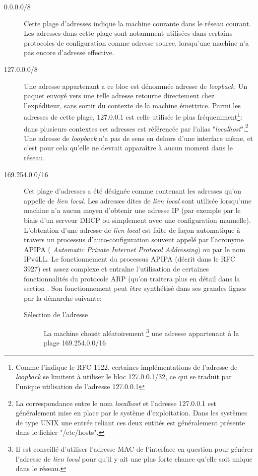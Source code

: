 \begin{description}
\item[0.0.0.0/8]
Cette plage d'adresses indique la machine courante dans le réseau courant.
Les adresses dans cette plage sont notamment utilisées dans certains protocoles de
configuration comme adresse source, lorsqu'une machine n'a pas encore d'adresse effective.

\item[127.0.0.0/8]
Une adresse appartenant a ce bloc est dénommée adresse de {\it loopback}.  Un
paquet envoyé vers une telle adresse retourne directement chez l'expéditeur, sans sortir
du contexte de la machine émettrice. Parmi les adresses de cette plage,
127.0.0.1 est celle utilisée le plus fréquemment\footnote{Comme l'indique
le RFC 1122, certaines implémentations de l'adresse de {\it loopback} se
limitent à utiliser le bloc 127.0.0.1/32, ce qui se traduit par l'unique utilisation de
l'adresse 127.0.0.1 }: dans plusieurs contextes cet adresses est référencée par
l'alias "{\it localhost}".\footnote{La correspondance entre le nom {\it localhost} et
l'adresse 127.0.0.1 est généralement mise en place par le système d'exploitation.
Dans les systèmes de type UNIX une entrée reliant ces deux entités est généralement
présente dans le fichier "/etc/hosts".}
Une adresse de {\it loopback} n'a pas de sens en dehors
d'une interface même, et c'est pour cela qu'elle ne devrait apparaître à aucun moment dans le réseau.


\item[169.254.0.0/16]
Cet plage d'adresses a été désignée comme contenant les adresses qu'on appelle
de {\it lien local}.  Les adresses dites de {\it lien local} sont utilisée lorsqu'une 
machine n'a aucun moyen d'obtenir une adresse IP (par exemple par le biais
d'un serveur DHCP ou simplement avec une configuration manuelle).  L'obtention
d'une adresse de {\it lien local} est faite de façon automatique à travers un
processus d'auto-configuration souvent appelé par l'acronyme APIPA ({\it
Automatic Private Internet Protocol Addressing}) ou par le nom IPv4LL.  Le
fonctionnement du processus APIPA (décrit dans le RFC 3927) est assez complexe
 et entraîne l'utilisation de certaines fonctionnalités du
protocole ARP (qu'on traitera plus en détail dans la section %
. Son fonctionnement peut être synthétisé dans ses grandes lignes par la démarche suivante:

\begin{description}
\item[Sélection de l'adresse]
La machine choisit aléatoirement
    \footnote{Il est conseillé d'utiliser l'adresse MAC de l'interface en question
    pour générer l'adresse de {\it lien local} pour qu'il y ait une plus forte chance
    qu'elle soit unique dans le réseau.} 
une adresse appartenant à la plage 169.254.0.0/16


\end{description}
\end{description}
